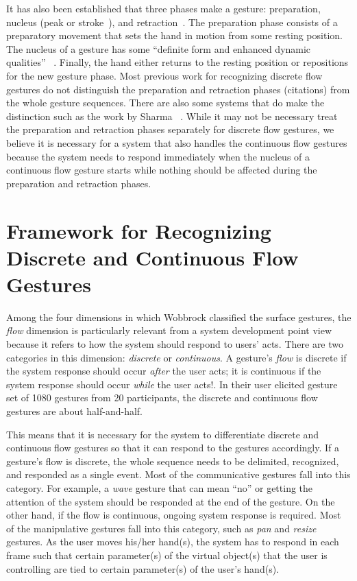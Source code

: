\documentclass[10pt,twocolumn,letterpaper]{article}
\begin{document}
It has also been established that three phases make a gesture: preparation, nucleus 
(peak or stroke~\cite{Mcneil82}), and retraction~\cite{Pavlovic97}. The preparation phase consists
of a preparatory movement that sets the hand in motion from some resting position.
The nucleus of a gesture has some ``definite form and enhanced dynamic qualities''
~\cite{kendon86}. Finally, the hand either returns to the resting position or repositions
for the new gesture phase. Most previous work for recognizing discrete flow gestures do not
distinguish the preparation and retraction phases (citations) from the whole gesture
sequences. There are also some systems that do make the distinction such as the work
by Sharma \etal~\cite{sharma00}. While it may not be necessary treat the preparation
and retraction phases separately for discrete flow gestures, we believe it is 
necessary for a system that also handles the continuous flow gestures because
the system needs to respond immediately when the nucleus of a continuous flow
gesture starts while nothing should be affected during the preparation and retraction
phases.   

\section{Framework for Recognizing Discrete and Continuous Flow Gestures}
Among the four dimensions in which Wobbrock \etal classified the surface gestures,
the \textit{flow} dimension is particularly relevant from a system development
point view because it refers to how the system should respond to users' acts. 
There are two categories in this dimension: \textit{discrete} or 
\textit{continuous}. A gesture's \textit{flow} is discrete if the system response
should occur \textit{after} the user acts; it is continuous if the system response
should occur \textit{while} the user acts!\cite{Wobbrock09}. In their user elicited
gesture set of 1080 gestures from 20 participants, the discrete and continuous flow 
gestures are about half-and-half.

This means that it is necessary for the system to differentiate discrete and continuous
flow gestures so that it can respond to the gestures accordingly. If a gesture's flow
is discrete, the whole sequence needs to be delimited, recognized, and responded
as a single event. Most of the communicative gestures fall into this category. 
For example, a \textit{wave} gesture that can mean ``no'' or getting the attention of the 
system should be responded at the end of the gesture. On the other hand, if the 
flow is continuous, ongoing system response is required. Most of the manipulative 
gestures fall into this category, such as \textit{pan} and \textit{resize} gestures. 
As the user moves his/her hand(s), the system has to respond in each frame such that
certain parameter(s) of the virtual object(s) that the user is controlling are tied to
certain parameter(s) of the user's hand(s).
\end{document}
